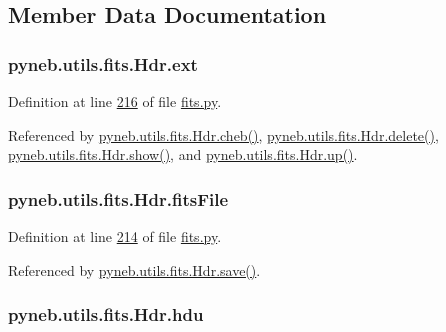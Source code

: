 \subsection{Member Data Documentation}
\hypertarget{classpyneb_1_1utils_1_1fits_1_1_hdr_a1c2f102effab05a497e3a21ed3291359}{
\subsubsection[{ext}]{\setlength{\rightskip}{0pt plus 5cm}pyneb.\-utils.\-fits.\-Hdr.\-ext}}\label{classpyneb_1_1utils_1_1fits_1_1_hdr_a1c2f102effab05a497e3a21ed3291359}


Definition at line \hyperlink{fits_8py_source_l00216}{216} of file \hyperlink{fits_8py_source}{fits.\-py}.



Referenced by \hyperlink{fits_8py_source_l00232}{pyneb.\-utils.\-fits.\-Hdr.\-cheb()}, \hyperlink{fits_8py_source_l00228}{pyneb.\-utils.\-fits.\-Hdr.\-delete()}, \hyperlink{fits_8py_source_l00219}{pyneb.\-utils.\-fits.\-Hdr.\-show()}, and \hyperlink{fits_8py_source_l00223}{pyneb.\-utils.\-fits.\-Hdr.\-up()}.

\hypertarget{classpyneb_1_1utils_1_1fits_1_1_hdr_a7c4dc491907edb52649262563df2e23c}{
\subsubsection[{fits\-File}]{\setlength{\rightskip}{0pt plus 5cm}pyneb.\-utils.\-fits.\-Hdr.\-fits\-File}}\label{classpyneb_1_1utils_1_1fits_1_1_hdr_a7c4dc491907edb52649262563df2e23c}


Definition at line \hyperlink{fits_8py_source_l00214}{214} of file \hyperlink{fits_8py_source}{fits.\-py}.



Referenced by \hyperlink{fits_8py_source_l00263}{pyneb.\-utils.\-fits.\-Hdr.\-save()}.

\hypertarget{classpyneb_1_1utils_1_1fits_1_1_hdr_a23de98701ac30e7c56654f92d9956fca}{
\subsubsection[{hdu}]{\setlength{\rightskip}{0pt plus 5cm}pyneb.\-utils.\-fits.\-Hdr.\-hdu}}\label{classpyneb_1_1utils_1_1fits_1_1_hdr_a23de98701ac30e7c56654f92d9956fca}


